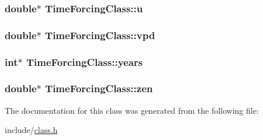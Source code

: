 \subsubsection[{\texorpdfstring{u}{u}}]{\setlength{\rightskip}{0pt plus 5cm}double$\ast$ Time\+Forcing\+Class\+::u}\hypertarget{class_time_forcing_class_a14f36478fa7ea19e9e05094c00f5ee14}{}\label{class_time_forcing_class_a14f36478fa7ea19e9e05094c00f5ee14}
\subsubsection[{\texorpdfstring{vpd}{vpd}}]{\setlength{\rightskip}{0pt plus 5cm}double$\ast$ Time\+Forcing\+Class\+::vpd}\hypertarget{class_time_forcing_class_ad1c6678262217da377fa1edb50824314}{}\label{class_time_forcing_class_ad1c6678262217da377fa1edb50824314}
\subsubsection[{\texorpdfstring{years}{years}}]{\setlength{\rightskip}{0pt plus 5cm}int$\ast$ Time\+Forcing\+Class\+::years}\hypertarget{class_time_forcing_class_a1c11295b098aa0154ef79432ad5b21d8}{}\label{class_time_forcing_class_a1c11295b098aa0154ef79432ad5b21d8}
\subsubsection[{\texorpdfstring{zen}{zen}}]{\setlength{\rightskip}{0pt plus 5cm}double$\ast$ Time\+Forcing\+Class\+::zen}\hypertarget{class_time_forcing_class_a89d0ec073d93916e4b920be661cb4300}{}\label{class_time_forcing_class_a89d0ec073d93916e4b920be661cb4300}


The documentation for this class was generated from the following file\+:\begin{DoxyCompactItemize}
\item 
include/\hyperlink{class_8h}{class.\+h}\end{DoxyCompactItemize}
